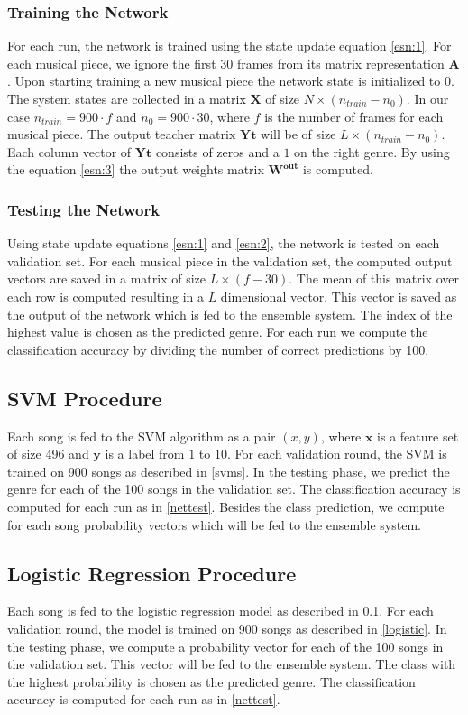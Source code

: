 \documentclass[a4paper,11pt,oneside]{article}
\begin{document}
\subsubsection*{Training the Network}
For each run, the network is trained using the state update equation \ref{esn:1}. For each musical piece, 
we ignore the first 30 frames from its matrix representation $\mathbf{A}$. Upon starting training a new musical 
piece the network state is initialized to $0$. The system states are collected in a matrix $\mathbf{X}$ of size 
$N\times (n_{train}-n_0)$. In our case $n_{train} = 900\cdot f$ and $n_0 = 900\cdot 30$, where $f$ is the number of 
frames for each musical piece. The output teacher matrix $\mathbf{Yt}$ will be of size $L\times (n_{train}-n_0)$. 
Each column vector of $\mathbf{Yt}$ consists of zeros and a $1$ on the right genre. By using the equation \ref{esn:3} 
the output weights matrix $\mathbf{W^{out}}$ is computed.
\subsubsection*{Testing the Network}\label{nettest}
Using state update equations \ref{esn:1} and \ref{esn:2}, the network is tested on each validation set.
For each musical piece in the validation set, the computed output vectors are saved in a matrix of size 
$L\times (f-30)$. The mean of this matrix over each row is computed resulting in a $L$ dimensional vector.
This vector is saved as the output of the network which is fed to the ensemble system.
The index of the highest value is chosen as the predicted genre. For each run we compute the classification accuracy
by dividing the number of correct predictions by 100. 
\subsection{SVM Procedure}\label{svmproc}
Each song is fed to the SVM algorithm as a pair $(x,y)$, where $\mathbf{x}$ is a feature set of size 496 
and $\mathbf{y}$ is a label from $1$ to $10$. For each validation round, the SVM is trained on 900 songs
as described in \ref{svms}. In the testing phase, we predict the genre for each of the 100 songs in the validation set.
The classification accuracy is computed for each run as in \ref{nettest}. Besides the class prediction, we compute
for each song probability vectors which will be fed to the ensemble system.
\subsection{Logistic Regression Procedure}\label{logproc}
Each song is fed to the logistic regression model as described in \ref{svmproc}. For each validation round, 
the model is trained on 900 songs as described in \ref{logistic}. In the testing phase, we compute a probability 
vector for each of the 100 songs in the validation set. This vector will be fed to the ensemble system. The class
with the highest probability is chosen as the predicted genre. The classification accuracy is computed for each run
as in \ref{nettest}.
\end{document}
